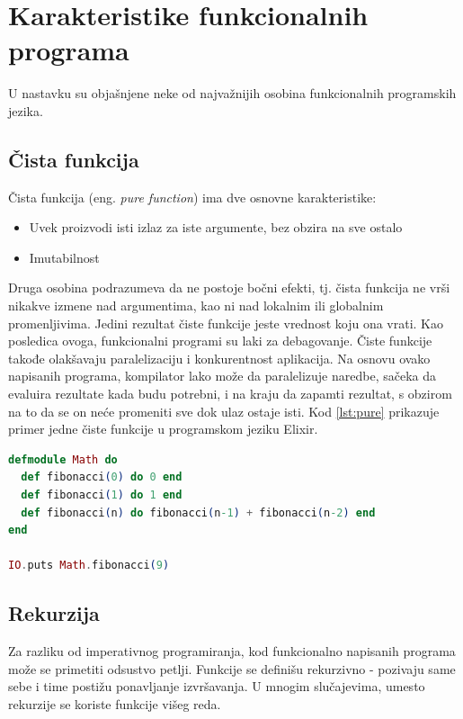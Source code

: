 \documentclass[12pt,oneside]{memoir}
\begin{document}
\section{Karakteristike funkcionalnih programa}
U nastavku su objašnjene neke od najvažnijih osobina funkcionalnih programskih jezika. 

\subsection{Čista funkcija}
Čista funkcija (eng. \textit{pure function}) ima dve osnovne karakteristike: 
\begin{itemize}
\item Uvek proizvodi isti izlaz za iste argumente, bez obzira na sve ostalo
\item Imutabilnost 
\end{itemize}
\par
Druga osobina podrazumeva da ne postoje bočni efekti, tj. čista funkcija ne vrši nikakve izmene nad argumentima, kao ni nad lokalnim ili globalnim promenljivima. Jedini rezultat čiste funkcije jeste vrednost koju ona vrati. Kao posledica ovoga, funkcionalni programi su laki za debagovanje. Čiste funkcije takođe olakšavaju paralelizaciju i konkurentnost aplikacija. Na osnovu ovako napisanih programa, kompilator lako može da paralelizuje naredbe, sačeka da evaluira rezultate kada budu potrebni, i na kraju da zapamti rezultat, s obzirom na to da se on neće promeniti sve dok ulaz ostaje isti. Kod \ref{lst:pure} prikazuje primer jedne čiste funkcije u programskom jeziku Elixir. 

\begin{lstlisting}[language=elixir, caption={Primer čiste funkcije},captionpos=b, label={lst:pure}]
defmodule Math do 
  def fibonacci(0) do 0 end
  def fibonacci(1) do 1 end
  def fibonacci(n) do fibonacci(n-1) + fibonacci(n-2) end
end

IO.puts Math.fibonacci(9)
\end{lstlisting}

\subsection{Rekurzija}
Za razliku od imperativnog programiranja, kod funkcionalno napisanih programa može se primetiti odsustvo petlji. Funkcije se definišu rekurzivno - pozivaju same sebe i time postižu ponavljanje izvršavanja. U mnogim slučajevima, umesto rekurzije se koriste funkcije višeg reda.
\end{document}
